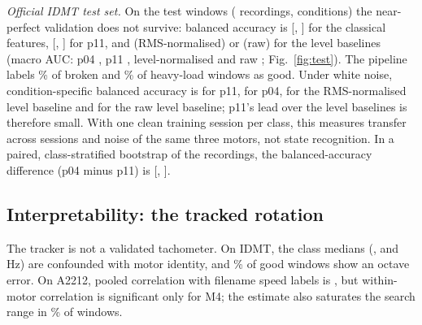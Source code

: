 \documentclass[conference]{IEEEtran}
\newif\ifwip
\begin{document}
\emph{Official IDMT test set.} On the \tstNWin{} test windows (\tstNRec{} recordings,
\tstNCond{} conditions) the near-perfect validation does not survive: balanced accuracy is
\tstBalCls{} [\tstBalClsLo{}, \tstBalClsHi{}] for the classical features, \tstBalDec{}
[\tstBalDecLo{}, \tstBalDecHi{}] for p11, and \tstBalRmsNorm{} (RMS-normalised) or
\tstBalRmsRaw{} (raw) for the level baselines
\ifwip. \else(macro AUC: p04 \tstAucCls{}, p11 \tstAucDec{}, level-normalised
\tstAucRmsNorm{} and raw \tstAucRmsRaw{}; Fig.~\ref{fig:test}).
The pipeline labels \tstPredGoodDecBrokenPct{}\% of broken and \tstPredGoodDecHeavyloadPct{}\% of
heavy-load windows as good. Under white noise, condition-specific balanced accuracy is
\tstBalDecWhite{} for p11, \tstBalClsWhite{} for p04, \tstBalRmsNormWhite{} for the
RMS-normalised level baseline and \tstBalRmsRawWhite{} for the raw level baseline; p11's lead
over the level baselines is therefore small. \fi With one clean training session per class, this measures transfer across
sessions and noise of the same three motors, not state recognition. In a paired, class-stratified
bootstrap of the \tstNRec{} recordings, the balanced-accuracy difference (p04 minus p11) is
\tstDeltaBalClassicalMinusHarmonic{}
[\tstDeltaBalClassicalMinusHarmonicLo{}, \tstDeltaBalClassicalMinusHarmonicHi{}].


\subsection{Interpretability: the tracked rotation}

\ifwip
On IDMT the median tracked rotation differs by class (\VRotIdmtGoodMed{},
\VRotIdmtBrokenMed{}, \VRotIdmtHeavyMed{}\,Hz), but class equals motor there. On A2212 its rank
correlation with the speed label of the files is \VRotBldcSpearman{} pooled over motors; within
motors it is \VRotBldcSpearmanMOne{} to \VRotBldcSpearmanMFour{} but significant only for M4
(\VRotBldcFilesMFour{} files), so it should not be read as shaft speed on that dataset.
\else
The tracker is not a validated tachometer. On IDMT, the class medians
(\VRotIdmtGoodMed{}, \VRotIdmtBrokenMed{} and \VRotIdmtHeavyMed{}\,Hz) are confounded with motor
identity, and \VRotIdmtGoodOctPct{}\% of good windows show an octave error. On A2212, pooled
correlation with filename speed labels is \VRotBldcSpearman{}, but within-motor correlation is
significant only for M4; the estimate also saturates the search range in
\VRotBldcCeilPct{}\% of windows.
\fi
\end{document}
